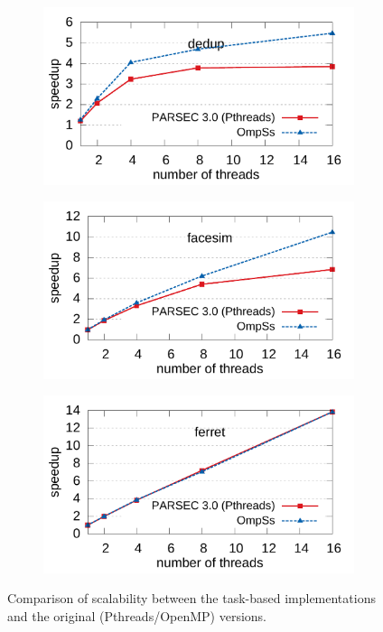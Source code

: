 \begin{figure}[p]
				\centering
        \begin{subfigure}[b]{0.8\textwidth}
                \includegraphics[width=\textwidth]{ifcg/figures/dedup_scale}
                \label{fig:dedup_scale}
        \end{subfigure}
\hfill
        \begin{subfigure}[b]{0.8\textwidth}
                \includegraphics[width=\textwidth]{ifcg/figures/facesim_scale}
                \label{fig:facesim_scale}
        \end{subfigure}
\hfill
				\begin{subfigure}[b]{0.8\textwidth}
                \includegraphics[width=\textwidth]{ifcg/figures/ferret_scale}
                \label{fig:ferret_scale}
        \end{subfigure}%
      \caption{Comparison of scalability between the task-based implementations and the original (Pthreads/OpenMP) versions.}
			\label{fig:scalability_graphs_2}
\end{figure}

